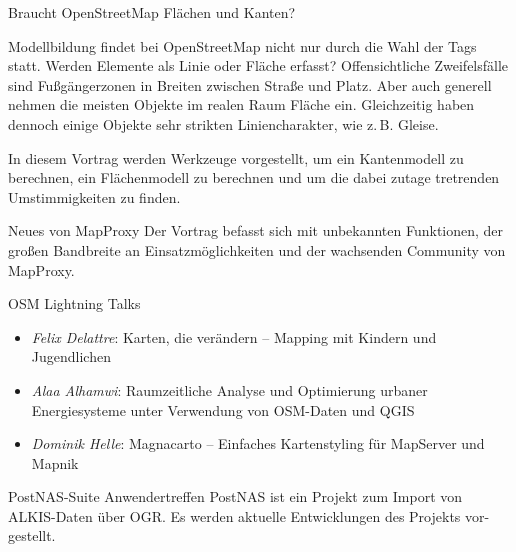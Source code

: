 %
{Braucht OpenStreetMap Flächen und Kanten?}%
{}%
{Modellbildung findet bei OpenStreetMap nicht nur durch die Wahl der Tags statt.
Werden Elemente als Linie oder Fläche erfasst?
Offensichtliche Zweifelsfälle sind Fußgängerzonen in Breiten zwischen Straße und Platz.
Aber auch generell nehmen die meisten Objekte im realen Raum Fläche ein.
Gleichzeitig haben dennoch einige Objekte sehr strikten Liniencharakter, wie z.\,B. Gleise.

In diesem Vortrag werden Werkzeuge vorgestellt,
um ein Kantenmodell zu berechnen, ein Flächenmodell zu berechnen
und um die dabei zutage tretrenden Umstimmigkeiten zu finden.
}


%
{Neues von MapProxy}%
{}%
{Der Vortrag befasst sich mit unbekannten Funktionen, der großen Bandbreite an Einsatzmöglichkeiten und der wachsenden Community von MapProxy.}


\abstractGiStudio{}%
{OSM Lightning Talks}%
{}%
{\RaggedRight\vspace{-2em}\begin{itemize}
		\setlength{\itemsep}{-2pt} %
		\item \emph{Felix Delattre}: Karten, die verändern -- Mapping mit Kindern und Jugendlichen
		\item \emph{Alaa Alhamwi}: Raumzeitliche Analyse und Opti\-mierung urbaner Energiesysteme unter Verwendung von OSM-Daten und QGIS
		\item \emph{Dominik Helle}: Magnacarto -- Einfaches Karten\-styling für MapServer und Mapnik 
	\end{itemize}
	\justifying
	}

%
{PostNAS-Suite Anwendertreffen}%
{}%
{PostNAS ist ein Projekt zum Import von ALKIS-Daten über
OGR. Es werden aktuelle Entwicklungen des Projekts vor-
gestellt.}\label{bof-montag}

\newpage
{}

\vspace{4\baselineskip}\newline
\enlargethispage{1\baselineskip}
\newpage %
